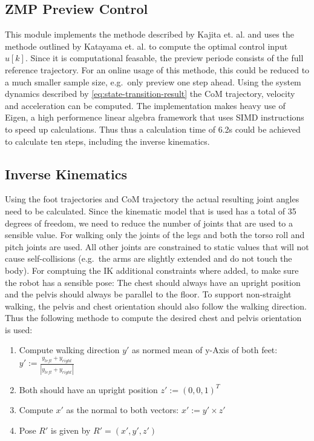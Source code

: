 \documentclass[english,ngerman]{KITreprt}
\begin{document}
\subsection{ZMP Preview Control}\label{zmp-preview-control}

This module implements the methode described by Kajita et. al. and uses
the methode outlined by Katayama et. al. to compute the optimal control
input $u[k]$. Since it is computational feasable, the preview periode
consists of the full reference trajectory. For an online usage of this
methode, this could be reduced to a much smaller sample size, e.g.~only
preview one step ahead. Using the system dynamics described by
\ref{eq:state-transition-result} the CoM trajectory, velocity and
acceleration can be computed. The implementation makes heavy use of
Eigen, a high performence linear algebra framework that uses SIMD
instructions to speed up calculations. Thus thus a calculation time of
6.2s could be achieved to calculate ten steps, including the inverse
kinematics.

\subsection{Inverse Kinematics}\label{inverse-kinematics}

Using the foot trajectories and CoM trajectory the actual resulting
joint angles need to be calculated. Since the kinematic model that is
used has a total of 35 degrees of freedom, we need to reduce the number
of joints that are used to a sensible value. For walking only the joints
of the legs and both the torso roll and pitch joints are used. All other
joints are constrained to static values that will not cause
self-collisions (e.g.~the arms are slightly extended and do not touch
the body). For comptuing the IK additional constraints where added, to
make sure the robot has a sensible pose: The chest should always have an
upright position and the pelvis should always be parallel to the floor.
To support non-straight walking, the pelvis and chest orientation should
also follow the walking direction. Thus the following methode to compute
the desired chest and pelvis orientation is used:

\begin{enumerate}
\def\labelenumi{\arabic{enumi}.}
\item
  Compute walking direction $y'$ as normed mean of y-Axis of both feet:
  $y' := \frac{y_{left} + y_{right}}{|y_{left} + y_{right}|}$
\item
  Both should have an upright position $z' := (0, 0, 1)^T$
\item
  Compute $x'$ as the normal to both vectors: $x' := y' \times z'$
\item
  Pose $R'$ is given by $R' = (x', y', z')$
\end{enumerate}
\end{document}
